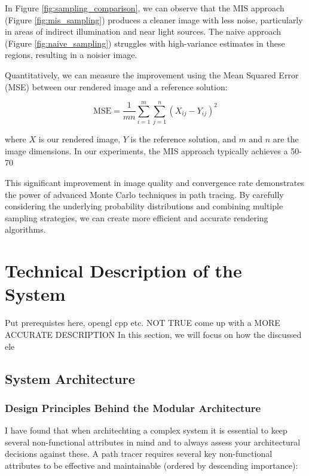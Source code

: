 \documentclass[12pt]{article}
\begin{document}
In Figure \ref{fig:sampling_comparison}, we can observe that the MIS approach (Figure \ref{fig:mis_sampling}) produces a cleaner image with less noise, particularly in areas of indirect illumination and near light sources. The naive approach (Figure \ref{fig:naive_sampling}) struggles with high-variance estimates in these regions, resulting in a noisier image.

Quantitatively, we can measure the improvement using the Mean Squared Error (MSE) between our rendered image and a reference solution:

\[
    \text{MSE} = \frac{1}{mn} \sum_{i=1}^m \sum_{j=1}^n (X_{ij} - Y_{ij})^2
\]

where \( X \) is our rendered image, \( Y \) is the reference solution, and \( m \) and \( n \) are the image dimensions. In our experiments, the MIS approach typically achieves a 50-70%

This significant improvement in image quality and convergence rate demonstrates the power of advanced Monte Carlo techniques in path tracing. By carefully considering the underlying probability distributions and combining multiple sampling strategies, we can create more efficient and accurate rendering algorithms.

\section{Technical Description of the System}
\label{sec:system-description}

Put prerequistes here, opengl cpp etc.
NOT TRUE come up with a MORE ACCURATE DESCRIPTION
In this section, we will focus on how the discussed ele

\subsection{System Architecture}

\subsubsection{Design Principles Behind the Modular Architecture}

I have found that when architechting a complex system it is essential to keep several non-functional attributes in mind and to always assess your architectural decisions against these.
A path tracer requires several key non-functional attributes to be effective and maintainable (ordered by descending importance):
\end{document}
